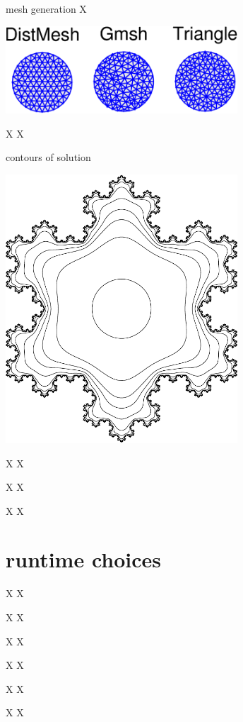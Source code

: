 \documentclass[hide notes,intlimits,usenames,dvipsnames]{beamer}
\begin{document}
\begin{frame}{mesh generation}
X

\includegraphics[width=0.65\textwidth]{meshcomparison}
\end{frame}


\begin{frame}{X}
X

 \qquad 
\end{frame}


\begin{frame}{contours of solution}
\begin{center}
\includegraphics[width=0.65\textwidth]{snowflake}
\end{center}
\end{frame}

\begin{frame}{X}
X
\end{frame}

\begin{frame}{X}
X
\end{frame}

\begin{frame}{X}
X
\end{frame}


\section{runtime choices}

\begin{frame}{X}
X
\end{frame}

\begin{frame}{X}
X
\end{frame}

\begin{frame}{X}
X
\end{frame}

\begin{frame}{X}
X
\end{frame}

\begin{frame}{X}
X
\end{frame}

\begin{frame}{X}
X
\end{frame}
\end{document}

